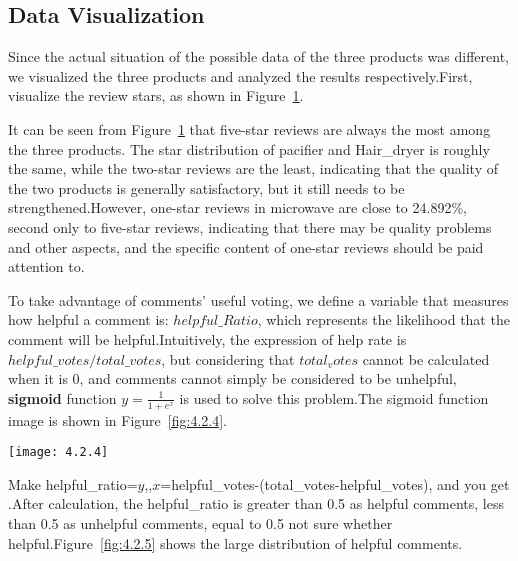 \documentclass[../mcmpaper]{subfiles}
\begin{document}
    \subsection{Data Visualization}
    Since the actual situation of the possible data of the three products was different, we visualized the three products and analyzed the results respectively.First, visualize the review stars, as shown in Figure~\ref{fig:4.2.1}.
    \begin{figure}[!ht]
    \centering
    \qquad
    \qquad
    \label{fig:4.2.1}
    \end{figure}
    \par
    It can be seen from Figure~\ref{fig:4.2.1} that five-star reviews are always the most among the three products. The star distribution of pacifier and Hair\_dryer is roughly the same, while the two-star reviews are the least, indicating that the quality of the two products is generally satisfactory, but it still needs to be strengthened.However, one-star reviews in microwave are close to 24.892\%, second only to five-star reviews, indicating that there may be quality problems and other aspects, and the specific content of one-star reviews should be paid attention to.
    \par
    To take advantage of comments' useful voting, we define a variable that measures how helpful a comment is: $helpful\_Ratio$, which represents the likelihood that the comment will be helpful.Intuitively, the expression of help rate is $helpful\_votes/total\_votes$, but considering that $total_votes$ cannot be calculated when it is 0, and comments cannot simply be considered to be unhelpful, \textbf{sigmoid} function $y=\frac{1}{1+e^{x}}$ is used to solve this problem.The sigmoid function image is shown in Figure~\ref{fig:4.2.4}.\\[1em]
    \begin{minipage}{1.0\linewidth}
    \centering
    \texttt{[image: 4.2.4]}
    \label{fig:4.2.4}
    \end{minipage}
    \par
   Make helpful\_ratio=$y$,,$x$=helpful\_votes-(total\_votes-helpful\_votes), and you get .After calculation, the helpful\_ratio is greater than 0.5 as helpful comments, less than 0.5 as unhelpful comments, equal to 0.5 not sure whether helpful.Figure~\ref{fig:4.2.5} shows the large distribution of helpful comments.\\[1em]
\end{document}
